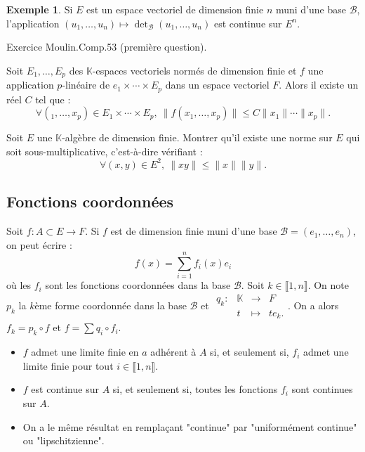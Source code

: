 \documentclass[french]{article}
\newcommand{\K}{\mathbb{K}}
\theoremstyle{plain}
\theoremstyle{definition}
\newtheorem*{ex}{Exemple}
\theoremstyle{remark}
\begin{document}
\begin{ex}
	Si $E$ est un espace vectoriel de dimension finie $n$ muni d'une base $\mathcal{B}$, l'application $(u_1,\ldots,u_n)\mapsto\det_\mathcal{B}(u_1,\ldots,u_n)$ est continue sur $E^n$.
\end{ex}

Exercice Moulin.Comp.53 (première question).

\begin{cor}%
	Soit $E_1,\ldots,E_p$ des $\K$-espaces vectoriels normés de dimension finie et $f$ une application $p$-linéaire de $e_1\times\cdots\times E_p$ dans un espace vectoriel $F$. Alors il existe un réel $C$ tel que : $$\forall (_1,\ldots,x_p)\in E_1\times\cdots\times E_p,\ \lVert f(x_1,\ldots,x_p)\rVert\leqslant C\lVert x_1\rVert\cdots\lVert x_p\rVert.$$
\end{cor}

\begin{exo}
	Soit $E$ une $\K$-algèbre de dimension finie. Montrer qu'il existe une norme sur $E$ qui soit sous-multiplicative, c'est-à-dire vérifiant : $$\forall (x,y)\in E^2,\ \lVert xy\rVert\leqslant\lVert x\rVert\lVert y\rVert.$$
\end{exo}

\subsection{Fonctions coordonnées}

Soit $f:A\subset E\to F$. Si $f$ est de dimension finie muni d'une base $\mathcal{B}=(e_1,\ldots,e_n)$, on peut écrire : $$f(x)=\sum_{i=1}^{n}f_i(x)e_i$$ où les $f_i$ sont les fonctions coordonnées dans la base $\mathcal{B}$. Soit $k\in\llbracket1,n\rrbracket$. On note $p_k$ la $k$ème forme coordonnée dans la base $\mathcal{B}$ et $\begin{array}{lrcl}
	q_k:&\K&\longrightarrow& F\\
	&t&\longmapsto& te_k.
\end{array}$.
On a alors $f_k=p_k\circ f$ et $f=\displaystyle\sum q_i\circ f_i$.

\begin{met}
	\begin{itemize}
		\item $f$ admet une limite finie en $a$ adhérent à $A$ si, et seulement si, $f_i$ admet une limite finie pour tout $i\in\llbracket1,n\rrbracket$.
		\item $f$ est continue sur $A$ si, et seulement si, toutes les fonctions $f_i$ sont continues sur $A$.
		\item On a le même résultat en remplaçant "continue" par "uniformément continue" ou "lipschitzienne".
	\end{itemize}
\end{met}
\end{document}
